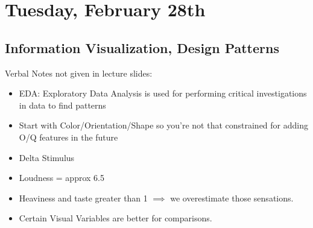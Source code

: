 \section{Tuesday, February 28th}
\subsection{Information Visualization, Design Patterns}
Verbal Notes not given in lecture slides:
\begin{itemize}
    \item EDA: Exploratory Data Analysis is used for performing critical investigations in data to find patterns
    \item Start with Color/Orientation/Shape so you're not that constrained for adding O/Q features in the future
    \item Delta Stimulus
    \item Loudness = approx 6.5
    \item Heaviness and taste greater than 1 $\implies$ we overestimate those sensations.
    \item Certain Visual Variables are better for comparisons.
\end{itemize}
